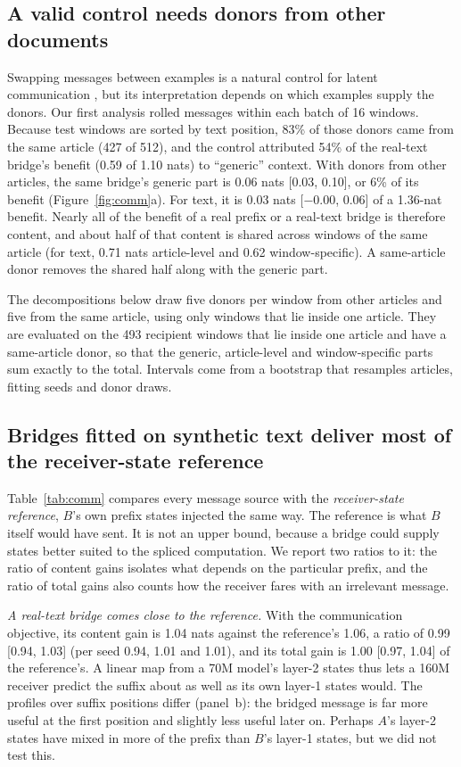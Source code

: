 \subsection{A valid control needs donors from other documents}
\label{sec:generic}
Swapping messages between examples is a natural control for latent communication \citep[cf.][]{du2025interlat}, but its interpretation depends on which examples supply the donors. Our first analysis rolled messages within each batch of 16 windows. Because test windows are sorted by text position, 83\% of those donors came from the same article (427 of 512), and the control attributed 54\% of the real-text bridge's benefit (0.59 of 1.10 nats) to ``generic'' context. With donors from other articles, the same bridge's generic part is 0.06 nats [0.03, 0.10], or 6\% of its benefit (Figure~\ref{fig:comm}a). For text, it is 0.03 nats [$-$0.00, 0.06] of a 1.36-nat benefit. Nearly all of the benefit of a real prefix or a real-text bridge is therefore content, and about half of that content is shared across windows of the same article (for text, 0.71 nats article-level and 0.62 window-specific). A same-article donor removes the shared half along with the generic part.

The decompositions below draw five donors per window from other articles and five from the same article, using only windows that lie inside one article. They are evaluated on the 493 recipient windows that lie inside one article and have a same-article donor, so that the generic, article-level and window-specific parts sum exactly to the total. Intervals come from a bootstrap that resamples articles, fitting seeds and donor draws.

\subsection{Bridges fitted on synthetic text deliver most of the receiver-state reference}
\label{sec:datafree}
Table~\ref{tab:comm} compares every message source with the \emph{receiver-state reference}, $B$'s own prefix states injected the same way. The reference is what $B$ itself would have sent. It is not an upper bound, because a bridge could supply states better suited to the spliced computation. We report two ratios to it: the ratio of content gains isolates what depends on the particular prefix, and the ratio of total gains also counts how the receiver fares with an irrelevant message.

\emph{A real-text bridge comes close to the reference.} With the communication objective, its content gain is 1.04 nats against the reference's 1.06, a ratio of 0.99 [0.94, 1.03] (per seed 0.94, 1.01 and 1.01), and its total gain is 1.00 [0.97, 1.04] of the reference's. A linear map from a 70M model's layer-2 states thus lets a 160M receiver predict the suffix about as well as its own layer-1 states would. The profiles over suffix positions differ (panel~b): the bridged message is far more useful at the first position and slightly less useful later on. Perhaps $A$'s layer-2 states have mixed in more of the prefix than $B$'s layer-1 states, but we did not test this.


